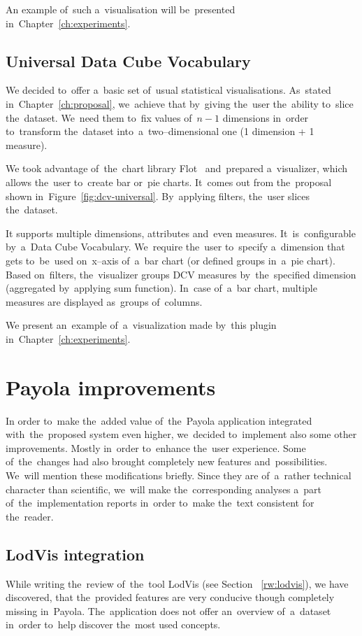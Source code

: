 An example of~such a~visualisation will be~presented in~Chapter~\ref{ch:experiments}.

\subsection{Universal Data Cube Vocabulary}
We decided to~offer a~basic set of~usual statistical visualisations. As~stated 
in~Chapter~\ref{ch:proposal}, we~achieve that by~giving the~user the~ability to~slice the~dataset. We~need them to~fix values of~$n-1$ dimensions in~order to~transform the~dataset into~a~two--dimensional one (1 dimension + 1 measure).

We took advantage of~the~chart library Flot~\cite{flot} and~prepared a~visualizer, which allows the~user to~create bar or~pie charts. It~comes out from the~proposal shown in~Figure~\ref{fig:dcv-universal}. By~applying filters, the~user slices the~dataset.

It supports multiple dimensions, attributes and~even measures. It~is~configurable by~a~Data Cube Vocabulary. We~require the~user to~specify a~dimension that gets to~be~used on~x--axis of~a~bar chart (or defined groups in~a~pie chart). Based on~filters, the~visualizer groups DCV measures by~the~specified 
dimension (aggregated by~applying sum function). In~case of~a~bar chart, multiple measures are 
displayed as~groups of~columns.

We present an~example of~a~visualization made by~this plugin in~Chapter~\ref{ch:experiments}.

\section{Payola improvements}
In order to~make the~added value of~the~Payola application integrated with~the~proposed system even higher, we~decided to~implement also some other
improvements. Mostly in~order to~enhance the~user experience. Some of~the~changes
had also brought completely new features and~possibilities. We~will mention 
these modifications briefly. Since they are of~a~rather technical character 
than scientific, we~will make the~corresponding analyses a~part of~the~implementation reports in~order to~make the~text consistent for the~reader.

\subsection{LodVis integration}
While writing the~review of~the~tool LodVis (see Section ~\ref{rw:lodvis}), 
we have discovered, that the~provided features are very conducive though completely 
missing in~Payola. The~application does not offer an~overview of~a~dataset in~order 
to~help discover the~most used concepts.

